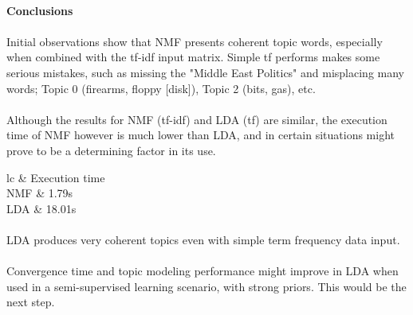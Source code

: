 \documentclass[12pt,a4paper]{report}
\begin{document}
\pagebreak

\paragraph{Conclusions}

\paragraph{} Initial observations show that NMF presents coherent topic words, especially when combined with the tf-idf input matrix. Simple tf performs makes some serious mistakes, such as missing the "Middle East Politics" and misplacing many words; Topic 0 (firearms, floppy [disk]), Topic 2 (bits, gas), etc.

\paragraph{} Although the results for NMF (tf-idf) and LDA (tf) are similar, the execution time of NMF however is much lower than LDA, and in certain situations might prove to be a determining factor in its use.

\begin{table}[!htbp]
\centering
\begin{tabular}{{lc}}
\hline
	& Execution time  \\ \hline
NMF & 1.79s \\ \hline
LDA & 18.01s \\ \hline
\end{tabular}
\end{table}

\paragraph{} LDA produces very coherent topics even with simple term frequency data input.

\paragraph{} Convergence time and topic modeling performance might improve in LDA when used in a semi-supervised learning scenario, with strong priors. This would be the next step.
\end{document}
